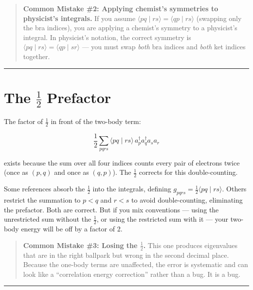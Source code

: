 \documentclass[
  11pt,
  oneside]{book}
\begin{document}
\begin{quote}
\textbf{Common Mistake \#2: Applying chemist's symmetries to physicist's
integrals.} If you assume
\(\langle pq \mid rs\rangle = \langle qp \mid rs\rangle\) (swapping only
the bra indices), you are applying a chemist's symmetry to a physicist's
integral. In physicist's notation, the correct symmetry is
\(\langle pq \mid rs\rangle = \langle qp \mid sr\rangle\) --- you must
swap \emph{both} bra indices and \emph{both} ket indices together.
\end{quote}

\begin{center}\rule{0.5\linewidth}{0.5pt}\end{center}

\section{\texorpdfstring{The \(\frac{1}{2}\)
Prefactor}{The \textbackslash frac\{1\}\{2\} Prefactor}}\label{the-frac12-prefactor}

The factor of \(\frac{1}{2}\) in front of the two-body term:

\[\frac{1}{2}\sum_{pqrs} \langle pq \mid rs\rangle\, a_p^\dagger a_q^\dagger a_s a_r\]

exists because the sum over all four indices counts every pair of
electrons twice (once as \((p, q)\) and once as \((q, p)\)). The
\(\frac{1}{2}\) corrects for this double-counting.

Some references absorb the \(\frac{1}{2}\) into the integrals, defining
\(g_{pqrs} = \frac{1}{2}\langle pq \mid rs\rangle\). Others restrict the
summation to \(p < q\) and \(r < s\) to avoid double-counting,
eliminating the prefactor. Both are correct. But if you mix conventions
--- using the unrestricted sum without the \(\frac{1}{2}\), or using the
restricted sum with it --- your two-body energy will be off by a factor
of 2.

\begin{quote}
\textbf{Common Mistake \#3: Losing the \(\frac{1}{2}\).} This one
produces eigenvalues that are in the right ballpark but wrong in the
second decimal place. Because the one-body terms are unaffected, the
error is systematic and can look like a ``correlation energy
correction'' rather than a bug. It is a bug.
\end{quote}

\begin{center}\rule{0.5\linewidth}{0.5pt}\end{center}
\end{document}
